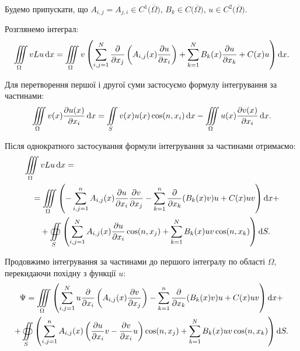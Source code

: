 Будемо припускати, що $A_{i, j} = A_{j, i} \in C^1 \big( \overline \Omega \big)$, $B_k \in C \big( \overline \Omega \big)$, $u \in C^2 \big( \overline \Omega \big)$. \medskip

Розглянемо інтеграл:
\begin{equation}
    \displaystyle\iiint\limits_\Omega v L u \mathop{}\!\mathrm{d} x = \displaystyle\iiint\limits_\Omega v \left( \displaystyle\sum\limits_{i, j = 1}^N \frac{\partial}{\partial x_j} \left( A_{i,j}(x) \frac{\partial u}{\partial x_i} \right) + \displaystyle\sum\limits_{k = 1}^N B_k(x) \frac{\partial u}{\partial x_k} + C(x) u \right) \mathop{}\!\mathrm{d} x.
\end{equation}

Для перетворення першої і другої суми застосуємо формулу інтегрування за частинами:
\begin{equation}
    \displaystyle\iiint\limits_\Omega v(x) \frac{\partial u(x)}{\partial x_i} \mathop{}\!\mathrm{d} x = \displaystyle\iint\limits_S v(x) u(x) \cos(n, x_i) \mathop{}\!\mathrm{d} x - \displaystyle\iiint\limits_\Omega u(x) \frac{\partial v(x)}{\partial x_i} \mathop{}\!\mathrm{d} x.
\end{equation}

Після однократного застосування формули інтегрування за частинами отримаємо:
\begin{equation}
    \begin{aligned}
        & \displaystyle\iiint\limits_\Omega v L u \mathop{}\!\mathrm{d} x = \\
        & \quad = \displaystyle\iiint\limits_\Omega \left( - \displaystyle\sum\limits_{i, j = 1}^n A_{i, j}(x) \frac{\partial u}{\partial x_i} \frac{\partial v}{\partial x_j} - \displaystyle\sum\limits_{k = 1}^n \frac{\partial}{\partial x_k} (B_k(x) v) u + C(x) u v \right) \mathop{}\!\mathrm{d} x + \\
        & \qquad + \displaystyle\oiint\limits_S \left( \displaystyle\sum\limits_{i, j = 1}^N A_{i, j}(x) \frac{\partial u}{\partial x_i} \cos(n, x_j) + \displaystyle\sum\limits_{k = 1}^N B_k(x) u v \cos(n, x_k) \right) \mathop{}\!\mathrm{d} S.
    \end{aligned}
\end{equation}


Продовжимо інтегрування за частинами до першого інтегралу по області $\Omega$, перекидаючи похідну з функції $u$:
\begin{multline}
    \Psi = \displaystyle\iiint\limits_\Omega \left( \displaystyle\sum\limits_{i, j = 1}^N u \frac{\partial}{\partial x_i} \left( A_{i,j}(x) \frac{\partial v}{\partial x_j} \right) - \displaystyle\sum\limits_{k = 1}^n \frac{\partial}{\partial x_k} (B_k(x) v) u + C(x) u v \right) \mathop{}\!\mathrm{d} x + \\
    + \displaystyle\oiint\limits_S \left( \displaystyle\sum\limits_{i, j = 1}^n A_{i,j}(x) \left( \frac{\partial u}{\partial x_i} v - \frac{\partial v}{\partial x_i} u \right) \cos(n, x_j) + \displaystyle\sum\limits_{k = 1}^N B_k(x) u v \cos(n, x_k) \right) \mathop{}\!\mathrm{d} S.
\end{multline}

